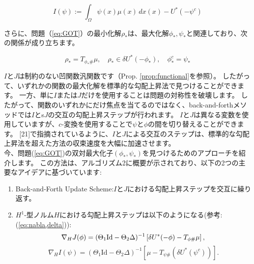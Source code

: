 \documentclass{jsarticle}
\theoremstyle{definition}
\begin{document}
\begin{equation}
    \label{eq:I2}
    I(\psi):= \int_{\Omega} \psi(x) \mu(x) \,dx(x) - U^*(- \psi^{c})
\end{equation}

さらに、問題（\ref{eq:GOT}）の最小化解$\rho_*$は、最大化解$\phi_*, \psi_*$と関連しており、次の関係が成り立ちます。

\begin{equation}
    \label{eq:maxmin}
    \rho_* = T_{\phi_* \#} \mu, \quad \rho_* \in \delta U^*(- \phi_*), \quad \phi^c_* = \psi_*
\end{equation}

$I$と$J$は制約のない凹関数汎関数です（Prop. \ref{prop:functional}を参照）。
したがって、いずれかの関数の最大化解を標準的な勾配上昇法で見つけることができます。
一方、単に$I$または$J$だけを使用することは問題の対称性を破壊します。
したがって、関数のいずれかにだけ焦点を当てるのではなく、back-and-forthメソッドでは$I$とs$J$の交互の勾配上昇ステップが行われます。
$I$と$J$は異なる変数を使用していますが、$c$-変換を使用することで$\psi$と$\phi$の間を切り替えることができます。
[21]で指摘されているように、$I$と$J$による交互のステップは、標準的な勾配上昇法を超えた方法の収束速度を大幅に加速させます。\\

今、問題(\ref{eq:GOT})の双対最大化子$(\phi_*, \psi_*)$を見つけるためのアプローチを紹介します。
この方法は、アルゴリズム2に概要が示されており、以下の2つの主要なアイデアに基づいています:

\begin{enumerate}
    \item Back-and-Forth Update Scheme:$I$と$J$における勾配上昇ステップを交互に繰り返す。
    \item $H^1$-型ノルム$H$における勾配上昇ステップは以下のようになる(参考:(\ref{eq:nabla,delta})):
    {\color{red}
        \begin{equation*}
            \nabla_H J(\phi) = (\Theta_1 \text{Id} - \Theta_2 \Delta)^{-1} \left[\delta U^*(- \phi)-  T_{\phi \#} \mu \right], \\
        \end{equation*}
        \begin{equation*}
            \nabla_H I(\psi) = (\Theta_1 \text{Id} - \Theta_2 \Delta)^{-1} \left[\mu - T_{\psi \#} (\delta U^*(\psi^c))\right].
        \end{equation*}
    }
\end{enumerate}
\end{document}
